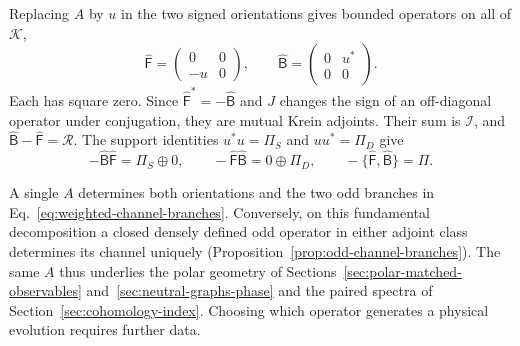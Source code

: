 \documentclass[11pt]{article}
\theoremstyle{definition}
\begin{document}
Replacing $A$ by $u$ in the two signed orientations gives bounded operators on all of $\mathcal K$,
\begin{equation}
 \widehat{\mathsf F}=\begin{pmatrix}0&0\\-u&0\end{pmatrix},
 \qquad
 \widehat{\mathsf B}=\begin{pmatrix}0&u^*\\0&0\end{pmatrix}.
 \label{eq:support-normalized-pair}
\end{equation}
Each has square zero. Since $\widehat{\mathsf F}^*=-\widehat{\mathsf B}$ and $J$ changes the sign of an off-diagonal operator under conjugation, they are mutual Krein adjoints. Their sum is $\mathcal I$, and $\widehat{\mathsf B}-\widehat{\mathsf F}=\mathcal R$. The support identities $u^*u=\Pi_S$ and $uu^*=\Pi_D$ give
\begin{equation}
 -\widehat{\mathsf B}\widehat{\mathsf F}=\Pi_S\oplus0,\qquad
 -\widehat{\mathsf F}\widehat{\mathsf B}=0\oplus\Pi_D,\qquad
 -\{\widehat{\mathsf F},\widehat{\mathsf B}\}=\Pi .
 \label{eq:support-normalized-products}
\end{equation}

A single $A$ determines both orientations and the two odd branches in Eq.~\eqref{eq:weighted-channel-branches}. Conversely, on this fundamental decomposition a closed densely defined odd operator in either adjoint class determines its channel uniquely (Proposition~\ref{prop:odd-channel-branches}). The same $A$ thus underlies the polar geometry of Sections~\ref{sec:polar-matched-observables} and~\ref{sec:neutral-graphs-phase} and the paired spectra of Section~\ref{sec:cohomology-index}. Choosing which operator generates a physical evolution requires further data.
\end{document}

